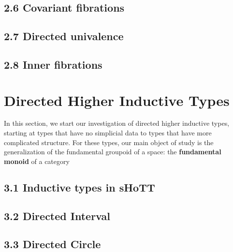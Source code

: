 \documentclass{article}
\theoremstyle{named}
\theoremstyle{remark}
\theoremstyle{definition}
\begin{document}
\subsection*{2.6 Covariant fibrations}

\setcounter{theorem}{0}

\subsection*{2.7 Directed univalence}

\setcounter{theorem}{0}


\subsection*{2.8 Inner fibrations}

\setcounter{theorem}{0}



\section{Directed Higher Inductive Types}
In this section, we start our investigation of directed higher inductive types, starting at types that have no simplicial data
to types that have more complicated structure. For these types, our main object of study is the generalization of the fundamental groupoid 
of a space: the \textbf{fundamental monoid} of a category
\subsection*{3.1 Inductive types in sHoTT}


\subsection*{3.2 Directed Interval}


\subsection*{3.3 Directed Circle}




\end{document}
